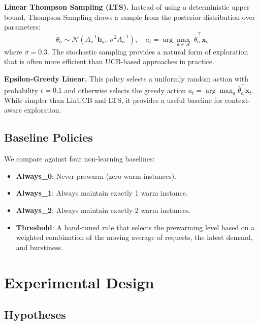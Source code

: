 \documentclass[11pt]{article}
\begin{document}
\textbf{Linear Thompson Sampling (LTS).} Instead of using a deterministic upper bound, Thompson Sampling draws a sample from the posterior distribution over parameters:
\begin{equation}
    \tilde{\theta}_a \sim \mathcal{N}\left(A_a^{-1} \mathbf{b}_a, \; \sigma^2 A_a^{-1}\right), \quad a_t = \arg\max_{a \in \mathcal{A}} \; \tilde{\theta}_a^\top \mathbf{x}_t
\end{equation}
where $\sigma = 0.3$. The stochastic sampling provides a natural form of exploration that is often more efficient than UCB-based approaches in practice.

\textbf{Epsilon-Greedy Linear.} This policy selects a uniformly random action with probability $\epsilon = 0.1$ and otherwise selects the greedy action $a_t = \arg\max_a \hat{\theta}_a^\top \mathbf{x}_t$. While simpler than LinUCB and LTS, it provides a useful baseline for context-aware exploration.

\subsection{Baseline Policies}

We compare against four non-learning baselines:
\begin{itemize}[nosep]
    \item \textbf{Always\_0}: Never prewarm (zero warm instances).
    \item \textbf{Always\_1}: Always maintain exactly 1 warm instance.
    \item \textbf{Always\_2}: Always maintain exactly 2 warm instances.
    \item \textbf{Threshold}: A hand-tuned rule that selects the prewarming level based on a weighted combination of the moving average of requests, the latest demand, and burstiness.
\end{itemize}

\section{Experimental Design}

\subsection{Hypotheses}
\end{document}
